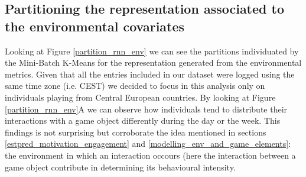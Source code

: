 \subsection{Partitioning the representation associated to the environmental covariates}
\label{partition_environment}
Looking at Figure \ref{partition_rnn_env} we can see the partitions individuated by the Mini-Batch K-Means for the representation generated from the environmental metrics. Given that all the entries included in our dataset were logged using the same time zone (i.e. CEST) we decided to focus in this analysis only on individuals playing from Central European countries. By looking at Figure \ref{partition_rnn_env}A we can observe how individuals tend to distribute their interactions with a game object differently during the day or the week. This findings is not surprising but corroborate the idea mentioned in sections \ref{estpred_motivation_engagement} and \ref{modelling_env_and_game_elements}: the environment in which an interaction occours (here the interaction between a game object  contribute in determining its behavioural intensity. 

